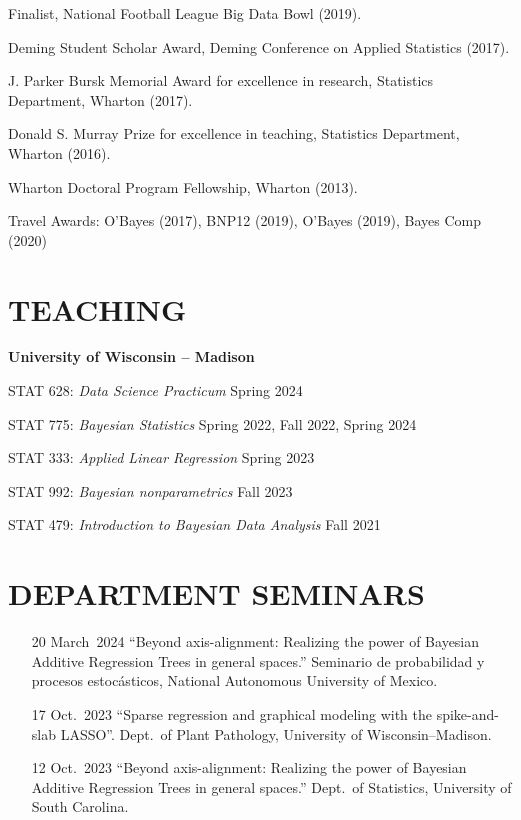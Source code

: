 \documentclass[margin]{res}
\begin{document}
\begin{resume}
Finalist, National Football League Big Data Bowl (2019).

Deming Student Scholar Award, Deming Conference on Applied Statistics (2017).

J. Parker Bursk Memorial Award for excellence in research, Statistics Department, Wharton (2017).

Donald S. Murray Prize for excellence in teaching, Statistics Department, Wharton (2016).

Wharton Doctoral Program Fellowship, Wharton (2013).

Travel Awards: O'Bayes (2017), BNP12 (2019), O'Bayes (2019), Bayes Comp (2020)

\section{TEACHING}

\textbf{University of Wisconsin -- Madison} 

STAT 628: {\it Data Science Practicum} \hfill Spring 2024

STAT 775: {\it Bayesian Statistics} \hfill Spring 2022, Fall 2022, Spring 2024

STAT 333: {\it Applied Linear Regression} \hfill Spring 2023

STAT 992: {\it Bayesian nonparametrics} \hfill Fall 2023

STAT 479: {\it Introduction to Bayesian Data Analysis} \hfill Fall 2021


\section{DEPARTMENT SEMINARS}

\vspace{0.5in}
{\small
\begin{itemize}
\item[20 March~2024]{``Beyond axis-alignment: Realizing the power of Bayesian Additive Regression Trees in general spaces.'' Seminario de probabilidad y procesos estoc\'{a}sticos, National Autonomous University of Mexico.}

\item[17 Oct.~2023]{``Sparse regression and graphical modeling with the spike-and-slab LASSO''. Dept.~of Plant Pathology, University of Wisconsin--Madison.}

\item[12 Oct.~2023]{``Beyond axis-alignment: Realizing the power of Bayesian Additive Regression Trees in general spaces.'' Dept.~of Statistics, University of South Carolina.}


\end{itemize}}
\end{resume}
\end{document}
